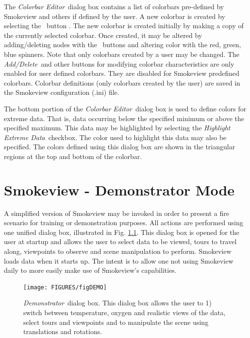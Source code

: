 \documentclass[11pt,twoside]{book}
\newcommand{\frameit}[1]{\fbox{\tt #1}}
\begin{document}
The {\em Colorbar Editor}\ dialog box contains a list of colorbars
pre-defined by Smokeview and others if defined by the user. A new
colorbar is created by selecting the \frameit{New}\ button . The
new colorbar is created initially by making a copy of the
currently selected colorbar. Once created, it may be altered by
adding/deleting nodes with the \frameit{Add/Delete}\ buttons and
altering color with the red, green, blue spinners. Note that only
colorbars created by a user may be changed. The {\em Add/Delete}\
and other buttons for modifying colorbar characteristics are only
enabled for user defined colorbars.  They are disabled for
Smokeview predefined colorbars. Colorbar definitions (only
colorbars created by the user) are saved in the Smokeview
configuration (.ini) file.

The bottom portion of the {\em Colorbar Editor}\ dialog box is
used to define colors for extreme data.  That is, data occurring
below the specified minimum or above the specified maximum.  This
data may be highlighted by selecting the {\em Highlight Extreme
Data}\ checkbox. The color used to highlight this data may also be
specified.  The colors defined using this dialog box are shown in
the triangular regions at the top and bottom of the colorbar.

\chapter{Smokeview - Demonstrator Mode}
A simplified version of Smokeview may be invoked in order to present a fire
scenario for training or demonstration
purposes.  All actions are performed using one unified dialog box,
illustrated in Fig. \ref{figDEMO}.  This dialog box is opened for the
user at startup and allows the user to select data to be viewed, tours to
travel along, viewpoints to observe and scene manipulation to perform.
Smokeview loads data when it starts up.
The intent is to allow one not using Smokeview daily to more easily
make use of Smokeview's capabilities.


\begin{figure}[\figoptions]
\begin{center}
\texttt{[image: FIGURES/figDEMO]}
\end{center}
\caption[{\em Demonstrator}\ dialog box.]{{\em Demonstrator}\ dialog box.
This dialog box allows the user to 1) switch between temperature,
oxygen and realistic views of the data,
select tours and viewpoints
 and to manipulate the scene using translations and rotations.} \label{figDEMO}
\end{figure}
\end{document}
